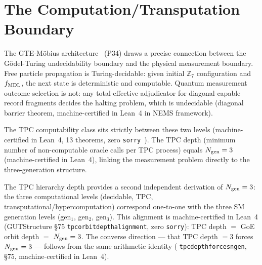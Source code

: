 \documentclass[11pt]{article}
\theoremstyle{remark}
\newcommand{\ZS}{\mathbb{Z}_7}
\newcommand{\Ngen}{N_{\rm gen}}
\newcommand{\fmdl}{f_{\rm MDL}}
\newcommand{\lean}[1]{%
  \penalty-100
  \begingroup\def\_{\textunderscore\allowbreak}\texttt{#1}\endgroup}
\begin{document}
\section{The Computation/Transputation Boundary}
\label{sec:tpc}

The GTE-M\"obius architecture~\cite{SpivackGTEMobius} (P34) draws a precise connection
between the Gödel-Turing undecidability boundary and the physical measurement boundary.
Free particle propagation is Turing-decidable: given initial $\ZS$ configuration and
$\fmdl$, the next state is deterministic and computable. Quantum measurement outcome
selection is not: any total-effective adjudicator for diagonal-capable record fragments
decides the halting problem, which is undecidable (diagonal barrier theorem, machine-certified in Lean~4
in NEMS framework).

The TPC computability class sits strictly between these two levels (machine-certified in Lean~4, 13 theorems, zero \texttt{sorry}~\cite{SpivackGTEMobius}).
The TPC depth (minimum number of non-computable oracle calls per TPC process) equals $\Ngen = 3$ (machine-certified in Lean~4),
linking the measurement problem directly to the three-generation structure.

The TPC hierarchy depth provides a second independent derivation of $\Ngen = 3$:
the three computational levels (decidable, TPC, transputational/hypercomputation)
correspond one-to-one with the three SM generation levels (gen$_1$, gen$_2$, gen$_3$).
This alignment is machine-certified in Lean~4 (GUTStructure \S75
\lean{tpc\_orbit\_depth\_alignment}, zero \texttt{sorry}):
TPC depth $=$ GoE orbit depth $=$ $\Ngen = 3$.
The converse direction --- that TPC depth $= 3$ forces $\Ngen = 3$ ---
follows from the same arithmetic identity
(\lean{tpc\_depth\_forces\_ngen}, \S75, machine-certified in Lean~4).
\end{document}

